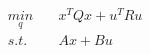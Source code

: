 \documentclass[preview]{standalone}
\begin{document}
\begin{align*}
\underset{q}{min} \quad &x^TQx + u^T R u \\ s.t. \quad &Ax + Bu
\end{align*}
\end{document}
